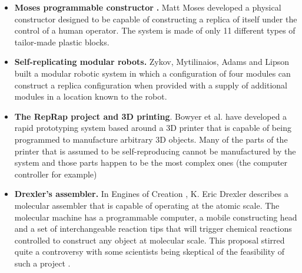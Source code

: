 \bigskip

\begin{itemize}
\item \textbf{Moses{\textquotesingle} programmable constructor
}\textbf{.} Matt Moses developed a physical constructor designed to be
capable of constructing a replica of itself under the control of a
human operator. The system is made of only 11 different types of
tailor-made plastic blocks.
\end{itemize}

\bigskip

\begin{itemize}
\item \textbf{Self-replicating modular robots.  }Zykov, Mytilinaios,
Adams and Lipson built a modular robotic system in which a
configuration of four modules can construct a replica configuration
when provided with a supply of additional modules in a location known
to the robot.
\end{itemize}

\bigskip

\begin{itemize}
\item \textbf{The RepRap project and 3D printing}. Bowyer et al.  have
developed a rapid prototyping system based around a 3D printer that is
capable of being programmed to manufacture arbitrary 3D objects. Many
of the parts of the printer that is assumed to be self-reproducing
cannot be manufactured by the system and those parts happen to be the
most complex ones (the computer controller for example)
\end{itemize}

\bigskip

\begin{itemize}
\item \textbf{Drexler’s assembler.} In Engines of Creation , K. Eric
Drexler describes a molecular assembler that is capable of operating at
the atomic scale. The molecular machine has a programmable computer, a
mobile constructing head and a set of interchangeable reaction tips
that will trigger chemical reactions controlled to construct any object
at molecular scale. This proposal stirred quite a controversy with some
scientists being skeptical of the feasibility of such a project . 
\end{itemize}

\bigskip


